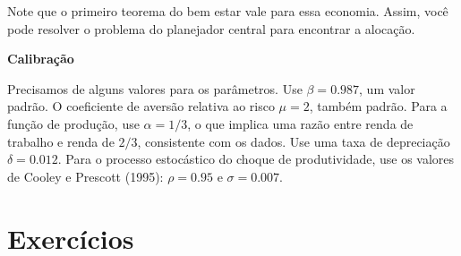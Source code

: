 \documentclass[10pt]{article}
\newcommand\0{\mathbf{0}}
\newcounter{exercise}
\newcounter{problem}[exercise]
\begin{document}
Note que o primeiro teorema do bem estar vale para essa economia. Assim, você pode resolver o problema do planejador central para encontrar a alocação.

\textbf{Calibração}

Precisamos de alguns valores para os parâmetros. Use $\beta = 0.987$, um valor padrão. O coeficiente de aversão relativa ao risco $\mu = 2$, também padrão. Para a função de produção, use $\alpha = 1/3$, o que implica uma razão entre renda de trabalho e renda de $2/3$, consistente com os dados. Use uma taxa de depreciação $\delta = 0.012$. Para o processo estocástico do choque de produtividade, use os valores de Cooley e Prescott (1995): $\rho = 0.95$ e $\sigma = 0.007$.

\newpage

\section*{Exercícios}
\end{document}
